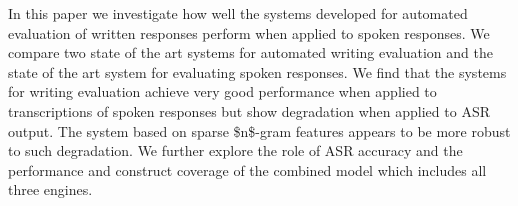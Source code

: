 In this paper we investigate how well the systems developed for automated evaluation of written responses perform when applied to spoken responses. We compare two state of the art systems for automated writing evaluation and the state of the art system for evaluating spoken responses. We find that the systems for writing evaluation achieve very good performance when applied to transcriptions of spoken responses but show degradation when applied to ASR output. The system based on sparse \$n\$-gram features appears to be more robust to such degradation. We further explore the role of ASR accuracy and the performance and construct coverage of the combined model which includes all three engines.
